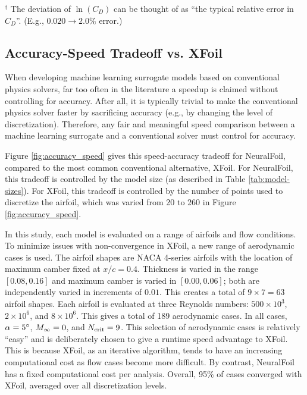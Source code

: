 \documentclass[journal]{new-aiaa}
\begin{document}
\begin{table}[H]
\begin{centering}
\begin{adjustbox}{width=\textwidth}
\begin{tblr}
                \bottomrule
            \end{tblr}
        \end{adjustbox}
    \end{centering}
    $^{\dagger}$ The deviation of $\ln(C_D)$ can be thought of as ``the typical relative error in $C_D$''. (E.g., $0.020 \rightarrow 2.0\%$ error.) \\
\end{table}

\subsection{Accuracy-Speed Tradeoff vs. XFoil}

When developing machine learning surrogate models based on conventional physics solvers, far too often in the literature a speedup is claimed without controlling for accuracy. After all, it is typically trivial to make the conventional physics solver faster by sacrificing accuracy (e.g., by changing the level of discretization). Therefore, any fair and meaningful speed comparison between a machine learning surrogate and a conventional solver must control for accuracy.

Figure \ref{fig:accuracy_speed} gives this speed-accuracy tradeoff for NeuralFoil, compared to the most common conventional alternative, XFoil. For NeuralFoil, this tradeoff is controlled by the model size (as described in Table \ref{tab:model-sizes}). For XFoil, this tradeoff is controlled by the number of points used to discretize the airfoil, which was varied from 20 to 260 in Figure \ref{fig:accuracy_speed}.

In this study, each model is evaluated on a range of airfoils and flow conditions. To minimize issues with non-convergence in XFoil, a new range of aerodynamic cases is used. The airfoil shapes are NACA 4-series airfoils with the location of maximum camber fixed at $x/c=0.4$. Thickness is varied in the range $[0.08, 0.16]$ and maximum camber is varied in $[0.00, 0.06]$; both are independently varied in increments of $0.01$. This creates a total of $9\times7=63$ airfoil shapes. Each airfoil is evaluated at three Reynolds numbers: $500\times10^3$, $2\times10^6$, and $8\times10^6$. This gives a total of 189 aerodynamic cases. In all cases, $\alpha=5\degree$, $M_\infty=0$, and $N_{\rm crit}=9$. This selection of aerodynamic cases is relatively ``easy'' and is deliberately chosen to give a runtime speed advantage to XFoil. This is because XFoil, as an iterative algorithm, tends to have an increasing computational cost as flow cases become more difficult. By contrast, NeuralFoil has a fixed computational cost per analysis. Overall, 95\% of cases converged with XFoil, averaged over all discretization levels.
\end{document}
